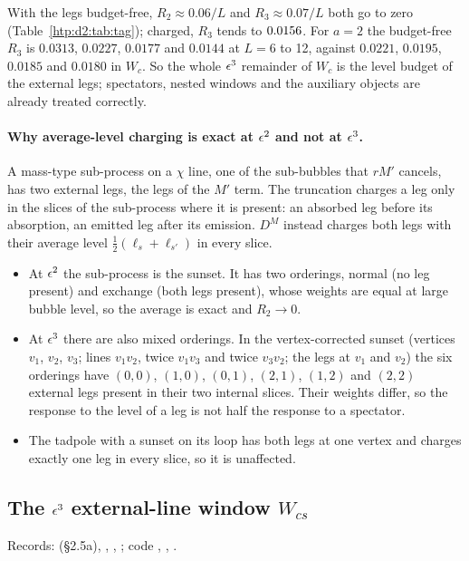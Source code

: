 With the legs budget-free, $R_2\approx0.06/L$ and $R_3\approx0.07/L$ both go to zero (Table~\ref{htp:d2:tab:tag}); charged,
$R_3$ tends to $0.0156$. For $a=2$ the budget-free $R_3$ is $0.0313$, $0.0227$, $0.0177$ and $0.0144$ at $L=6$
to 12, against $0.0221$, $0.0195$, $0.0185$ and $0.0180$ in $W_c$. So the whole $\epsilon^3$ remainder of $W_c$ is the level
budget of the external legs; spectators, nested windows and the auxiliary objects are already treated correctly.

\paragraph{Why average-level charging is exact at $\epsilon^2$ and not at $\epsilon^3$.} A mass-type sub-process on a $\chi$ line,
one of the sub-bubbles that $rM'$ cancels, has two external legs, the legs of the $M'$ term. The truncation charges a leg only
in the slices of the sub-process where it is present: an absorbed leg before its absorption, an emitted leg after its
emission. $D^M$ instead charges both legs with their average level $\frac12(\ell_s+\ell_{s'})$ in every slice.
\begin{itemize}
\item At $\epsilon^2$ the sub-process is the sunset. It has two orderings, normal (no leg present) and exchange (both legs
 present), whose weights are equal at large bubble level, so the average is exact and $R_2\to0$.
\item At $\epsilon^3$ there are also mixed orderings. In the vertex-corrected sunset (vertices $v_1$, $v_2$, $v_3$; lines $v_1v_2$, twice $v_1v_3$ and twice $v_3v_2$;
 the legs at $v_1$ and $v_2$) the six orderings have $(0,0)$, $(1,0)$, $(0,1)$, $(2,1)$, $(1,2)$ and $(2,2)$ external legs present in
 their two internal slices. Their weights differ, so the response to the level of a leg is not half the response to a
 spectator.
\item The tadpole with a sunset on its loop has both legs at one vertex and charges exactly one leg in every slice, so it is
 unaffected.
\end{itemize}

\subsection{The \texorpdfstring{$\epsilon^3$}{eps3} external-line window \texorpdfstring{$W_{cs}$}{Wcs}}\label{htp:d2:app:wcs}
{\small\raggedright\noindent Records:  (\S2.5a),
, ,
; code ,
, .\par}

